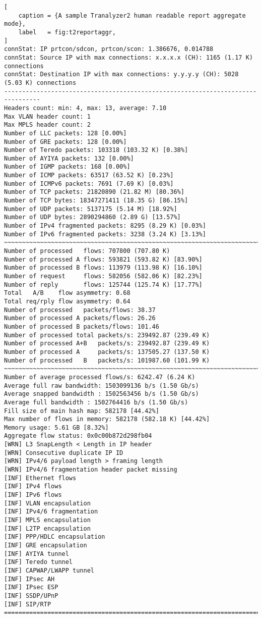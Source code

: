 \begin{lstlisting}[
    caption = {A sample Tranalyzer2 human readable report aggregate mode},
    label   = fig:t2reportaggr,
]
connStat: IP prtcon/sdcon, prtcon/scon: 1.386676, 0.014788
connStat: Source IP with max connections: x.x.x.x (CH): 1165 (1.17 K) connections
connStat: Destination IP with max connections: y.y.y.y (CH): 5028 (5.03 K) connections
--------------------------------------------------------------------------------
Headers count: min: 4, max: 13, average: 7.10
Max VLAN header count: 1
Max MPLS header count: 2
Number of LLC packets: 128 [0.00%]
Number of GRE packets: 128 [0.00%]
Number of Teredo packets: 103318 (103.32 K) [0.38%]
Number of AYIYA packets: 132 [0.00%]
Number of IGMP packets: 168 [0.00%]
Number of ICMP packets: 63517 (63.52 K) [0.23%]
Number of ICMPv6 packets: 7691 (7.69 K) [0.03%]
Number of TCP packets: 21820890 (21.82 M) [80.36%]
Number of TCP bytes: 18347271411 (18.35 G) [86.15%]
Number of UDP packets: 5137175 (5.14 M) [18.92%]
Number of UDP bytes: 2890294860 (2.89 G) [13.57%]
Number of IPv4 fragmented packets: 8295 (8.29 K) [0.03%]
Number of IPv6 fragmented packets: 3238 (3.24 K) [3.13%]
~~~~~~~~~~~~~~~~~~~~~~~~~~~~~~~~~~~~~~~~~~~~~~~~~~~~~~~~~~~~~~~~~~~~~~~~~~~~~~~~
Number of processed   flows: 707800 (707.80 K)
Number of processed A flows: 593821 (593.82 K) [83.90%]
Number of processed B flows: 113979 (113.98 K) [16.10%]
Number of request     flows: 582056 (582.06 K) [82.23%]
Number of reply       flows: 125744 (125.74 K) [17.77%]
Total   A/B    flow asymmetry: 0.68
Total req/rply flow asymmetry: 0.64
Number of processed   packets/flows: 38.37
Number of processed A packets/flows: 26.26
Number of processed B packets/flows: 101.46
Number of processed total packets/s: 239492.87 (239.49 K)
Number of processed A+B   packets/s: 239492.87 (239.49 K)
Number of processed A     packets/s: 137505.27 (137.50 K)
Number of processed   B   packets/s: 101987.60 (101.99 K)
~~~~~~~~~~~~~~~~~~~~~~~~~~~~~~~~~~~~~~~~~~~~~~~~~~~~~~~~~~~~~~~~~~~~~~~~~~~~~~~~
Number of average processed flows/s: 6242.47 (6.24 K)
Average full raw bandwidth: 1503099136 b/s (1.50 Gb/s)
Average snapped bandwidth : 1502563456 b/s (1.50 Gb/s)
Average full bandwidth : 1502764416 b/s (1.50 Gb/s)
Fill size of main hash map: 582178 [44.42%]
Max number of flows in memory: 582178 (582.18 K) [44.42%]
Memory usage: 5.61 GB [8.32%]
Aggregate flow status: 0x0c00b872d298fb04
[WRN] L3 SnapLength < Length in IP header
[WRN] Consecutive duplicate IP ID
[WRN] IPv4/6 payload length > framing length
[WRN] IPv4/6 fragmentation header packet missing
[INF] Ethernet flows
[INF] IPv4 flows
[INF] IPv6 flows
[INF] VLAN encapsulation
[INF] IPv4/6 fragmentation
[INF] MPLS encapsulation
[INF] L2TP encapsulation
[INF] PPP/HDLC encapsulation
[INF] GRE encapsulation
[INF] AYIYA tunnel
[INF] Teredo tunnel
[INF] CAPWAP/LWAPP tunnel
[INF] IPsec AH
[INF] IPsec ESP
[INF] SSDP/UPnP
[INF] SIP/RTP
================================================================================
\end{lstlisting}

